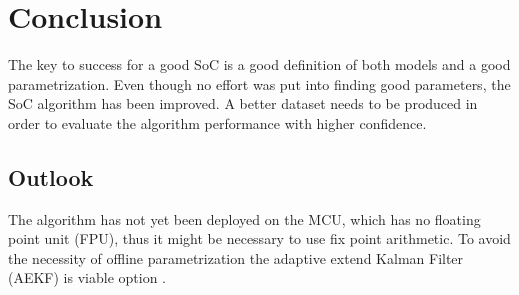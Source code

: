 %
%


\chapter{Conclusion}

The key to success for a good SoC is a good definition of both models and a good parametrization. Even though no effort was put into finding good parameters, the SoC algorithm has been improved. A better dataset needs to be produced in order to evaluate the algorithm performance with higher confidence.  


\section{Outlook} 

The algorithm has not yet been deployed on the MCU, which has no floating point unit (FPU), thus it might be necessary to use fix point arithmetic. To avoid the necessity of offline parametrization the adaptive extend Kalman Filter (AEKF) is viable option \cite{wang2021augmented}. 


